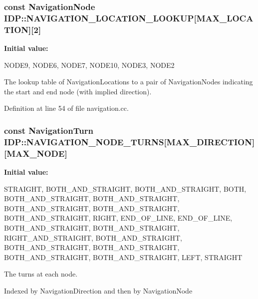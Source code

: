\hypertarget{namespaceIDP_a33e1b72d66088b211bfeb61b18d7b63b}{
\subsubsection[{NAVIGATION\_\-LOCATION\_\-LOOKUP}]{\setlength{\rightskip}{0pt plus 5cm}const {\bf NavigationNode} {\bf IDP::NAVIGATION\_\-LOCATION\_\-LOOKUP}\mbox{[}MAX\_\-LOCATION\mbox{]}\mbox{[}2\mbox{]}}}
\label{namespaceIDP_a33e1b72d66088b211bfeb61b18d7b63b}
{\bfseries Initial value:}
\begin{DoxyCode}
 {
        {NODE9, NODE6}, 
        {NODE7, NODE10},
        {NODE3, NODE2}  
    }
\end{DoxyCode}


The lookup table of NavigationLocations to a pair of NavigationNodes indicating the start and end node (with implied direction). 



Definition at line 54 of file navigation.cc.

\hypertarget{namespaceIDP_aa117cb76acf18e6af22830d5f2468ff4}{
\subsubsection[{NAVIGATION\_\-NODE\_\-TURNS}]{\setlength{\rightskip}{0pt plus 5cm}const {\bf NavigationTurn} {\bf IDP::NAVIGATION\_\-NODE\_\-TURNS}\mbox{[}MAX\_\-DIRECTION\mbox{]}\mbox{[}MAX\_\-NODE\mbox{]}}}
\label{namespaceIDP_aa117cb76acf18e6af22830d5f2468ff4}
{\bfseries Initial value:}
\begin{DoxyCode}
 {
        {STRAIGHT, BOTH_AND_STRAIGHT, BOTH_AND_STRAIGHT, BOTH,
            BOTH_AND_STRAIGHT, BOTH_AND_STRAIGHT, BOTH_AND_STRAIGHT,
            BOTH_AND_STRAIGHT, BOTH_AND_STRAIGHT, RIGHT, END_OF_LINE},
        {END_OF_LINE, BOTH_AND_STRAIGHT, BOTH_AND_STRAIGHT, RIGHT_AND_STRAIGHT,
            BOTH_AND_STRAIGHT, BOTH_AND_STRAIGHT, BOTH_AND_STRAIGHT,
            BOTH_AND_STRAIGHT, BOTH_AND_STRAIGHT, LEFT, STRAIGHT}
    }
\end{DoxyCode}


The turns at each node. 

Indexed by NavigationDirection and then by NavigationNode 

